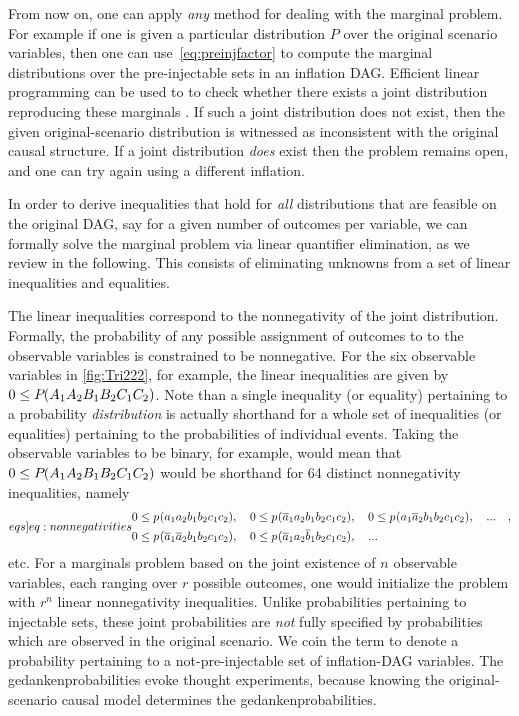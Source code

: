 {

From now on, one can apply \emph{any} method for dealing with the marginal problem. For example if one is given a particular distribution $P$ over the original scenario variables, then one can use~\cref{eq:preinjfactor} to compute the marginal distributions over the pre-injectable sets in an inflation DAG. Efficient linear programming can be used to to check whether there exists a joint distribution reproducing these marginals \cite{Korovin2012ImplementingCRA,Bobot2012SimplexSAT}. If such a joint distribution does not exist, then the given original-scenario distribution is witnessed as inconsistent with the original causal structure. If a joint distribution \emph{does} exist then the problem remains open, and one can try again using a different inflation.

In order to derive inequalities that hold for \emph{all} distributions that are feasible on the original DAG, say for a given number of outcomes per variable, we can formally solve the marginal problem via linear quantifier elimination, as we review in the following. This consists of eliminating unknowns from a set of linear inequalities and equalities.

The linear inequalities correspond to the nonnegativity of the joint distribution. Formally, the probability of any possible assignment of outcomes to to the observable variables is constrained to be nonnegative. For the six observable variables in \cref{fig:Tri222}, for example, the linear inequalities are given by $0\leq {P_{}}\lparen A_1 A_2 B_1 B_2 C_1 C_2\rparen$. Note than a single inequality (or equality) pertaining to a probability \emph{distribution} is actually shorthand for a whole set of inequalities (or equalities) pertaining to the probabilities of individual events. Taking the observable variables to be binary, for example, would mean that $0\leq {P_{}}\lparen A_1 A_2 B_1 B_2 C_1 C_2\rparen$ would be shorthand for 64 distinct nonnegativity inequalities, namely
\begin{align}\label[eqs]{eq:nonnegativities}
\begin{split}
 & 0\leq \p{a_1 a_2 b_1 b_2 c_1 c_2} ,\quad
 0\leq \p{\n{a}_1 a_2 b_1 b_2 c_1 c_2} ,\quad
 0\leq \p{a_1 \n{a}_2 b_1 b_2 c_1 c_2} ,\quad...\quad,\\
 &
 0\leq \p{\n{a}_1 \n{a}_2 b_1 b_2 c_1 c_2} ,\quad
 0\leq \p{\n{a}_1 a_2 \n{b}_1 b_2 c_1 c_2}, \quad ...
\end{split}
\end{align}
etc. For a marginals problem based on the joint existence of $n$ observable variables, each ranging over $r$ possible outcomes, one would initialize the problem with $r^n$ linear nonnegativity inequalities. Unlike probabilities pertaining to injectable sets, these joint probabilities are \emph{not} fully specified by probabilities which are observed in the original scenario. We coin the term  to denote a probability pertaining to a not-pre-injectable set of inflation-DAG variables. The gedankenprobabilities evoke thought experiments, because knowing the original-scenario causal model determines the gedankenprobabilities. %

}
